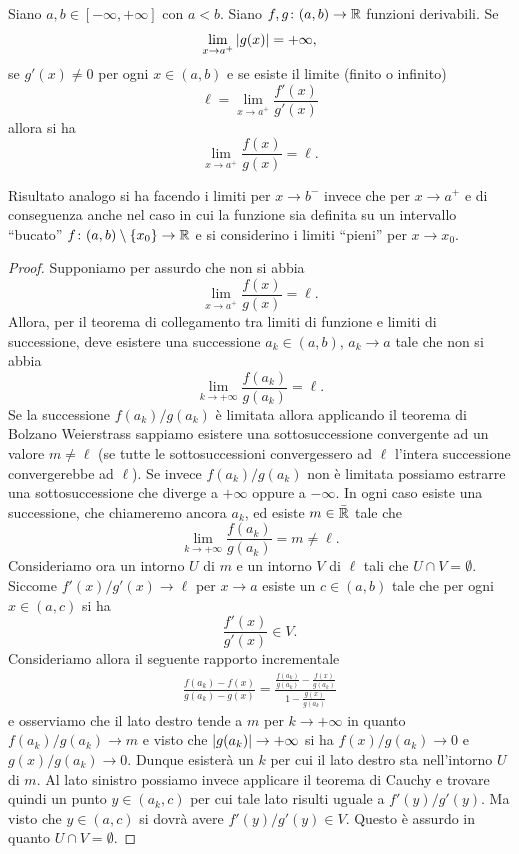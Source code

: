 \begin{theorem}
\mymark{*}
%
Siano $a,b\in [-\infty,+\infty]$ con $a<b$.
Siano $f,g \colon (a,b)\to {\mathbb R}$ funzioni derivabili.
Se
\[
 \lim_{x\to a^+} {\left|g(x)\right|} = +\infty,
\]
se $g'(x) \neq 0$ per ogni $x\in (a,b)$
e se esiste il limite (finito o infinito)
\[
  \ell = \lim_{x\to a^+}\frac{f'(x)}{g'(x)}
\]
allora
si ha
\[
 \lim_{x\to a^+}\frac{f(x)}{g(x)} = \ell.
\]

Risultato analogo si ha facendo i limiti per $x\to b^-$ invece che per $x\to a^+$ e di conseguenza anche nel caso in cui la funzione sia definita su un intervallo ``bucato''
$f\colon (a,b)\setminus{\left\{ x_0 \right\}} \to {\mathbb R}$ e si considerino i limiti ``pieni'' per $x\to x_0$.
\end{theorem}
%
\begin{proof}
Supponiamo per assurdo che non si abbia
\[
  \lim_{x\to a^+} \frac{f(x)}{g(x)} = \ell.
\]
Allora, per il teorema di collegamento tra limiti di funzione e limiti di successione, deve esistere una successione $a_k\in (a,b)$, $a_k\to a$ tale che non si abbia
\[
  \lim_{k\to +\infty} \frac{f(a_k)}{g(a_k)} = \ell.
\]
Se la successione $f(a_k) / g(a_k)$ è limitata allora applicando il teorema di Bolzano Weierstrass sappiamo esistere una sottosuccessione
convergente ad un valore $m\neq \ell$ (se tutte le sottosuccessioni convergessero ad $\ell$ l'intera successione convergerebbe ad $\ell$).
Se invece $f(a_k) / g(a_k)$ non è limitata possiamo estrarre una sottosuccessione che diverge a $+\infty$ oppure a $-\infty$. In ogni caso esiste una successione, che chiameremo ancora $a_k$, ed esiste $m\in \bar {{\mathbb R}}$ tale che
\[
  \lim_{k \to +\infty} \frac{f(a_k)}{g(a_k)} = m \neq \ell.
\]
Consideriamo ora un intorno $U$ di $m$ e un intorno $V$ di $\ell$ tali che $U\cap V = \emptyset$.
Siccome $f'(x) / g'(x) \to \ell$ per $x\to a$ esiste un $c\in (a,b)$ tale che per ogni $x\in (a,c)$ si ha
\[
  \frac{f'(x)}{g'(x)} \in V.
\]
Consideriamo allora il seguente rapporto incrementale
\begin{align*}
\frac{f(a_k) - f(x)}{g(a_k) - g(x)}
=\frac{\frac{f(a_k)}{g(a_k)}-\frac{f(x)}{g(a_k)}}{1-\frac{g(x)}{g(a_k)}}
\end{align*}
e osserviamo che il lato destro tende a $m$ per $k\to +\infty$ in quanto $f(a_k)/g(a_k) \to m$ e visto che ${\left|g(a_k)\right|}\to +\infty$ si ha $f(x)/g(a_k)\to 0$ e $g(x)/g(a_k) \to 0$.
Dunque esisterà un $k$ per cui il lato destro sta nell'intorno $U$ di $m$. Al lato sinistro possiamo invece applicare il teorema di Cauchy e trovare quindi un punto $y\in(a_k,c)$ per cui tale lato risulti
uguale a $f'(y)/g'(y)$. Ma visto che $y\in (a,c)$ si dovrà avere $f'(y)/g'(y) \in V$. Questo è assurdo in quanto $U\cap V = \emptyset$.
\end{proof}

